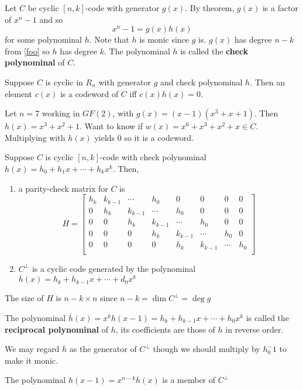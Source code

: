 \documentclass{article}
\begin{document}
\begin{definition}
  Let \( C \) be cyclic \( [n, k] \)-code with generator \( g(x) \).
  By theorem, \( g(x) \) is a factor of \( x^n-1 \) and so \[
    x^n-1= g(x)h(x)
  \] for some polynominal \( h \). Note that \( h  \) is monic since
  \( g  \) is. \( g(x) \) has degree \( n-k  \) from \autoref{foo} so
  \( h  \) has degree \( k \). The polynominal \( h  \) is called the
  \textbf{check polynominal} of \( C \).
\end{definition}
\begin{theorem}
  Suppose \( C \) is cyclic in \( R_n  \) with generator \( g  \) and
  check polynominal \( h \). Then an element \( c(x)  \) is a
  codeword of \( C \) iff \( c(x)h(x) = 0 \).
\end{theorem}
\begin{example}
  Let \( n = 7 \) working in \( GF(2) \), with \( g(x) =  (x-1)(x^3+x+1)\). Then \( h(x) = x^3+x^2+1 \). Want to know if \( w(x) = x^6+x^3+x^2+x \in C \). Multiplying with \( h(x) \) yields \( 0 \) so it is a codeword.
\end{example}
\begin{theorem}
  Suppose \( C  \) is cyclic \( [n, k] \)-code with check polynominal
  \( h(x) = h_0 + h_1x + \cdots + h_kx^k \). Then,
  \begin{enumerate}
    \item a parity-check matrix for \( C  \) is \[
            H =
            \begin{bmatrix}
              h_k & k_{k-1} & \cdots  & h_0     & 0       & 0       & 0      & 0   \\
              0   & h_k     & k_{k-1} & \cdots  & h_0     & 0       & 0      & 0   \\
              0   & 0       & h_k     & k_{k-1} & \cdots  & h_0     & 0      & 0   \\
              0   & 0       & 0       & h_k     & k_{k-1} & \cdots  & h_0    & 0   \\
              0   & 0       & 0       & 0       & h_k     & k_{k-1} & \cdots & h_0 \\
            \end{bmatrix}
          \]
    \item \( C^\perp \) is a cyclic code generated by the polynominal \(
          \overline{h}(x) = h_k + h_{k-1}x + \cdots + d_0x^k   \)
  \end{enumerate}

  The size of \( H \) is \( n - k \times n\) since \( n-k = \dim C^\perp = \deg g  \) 
\end{theorem}
\begin{definition}
  The polynominal \( \overline{h}(x) = x^kh(x-1) = h_k + h_{k-1}x + \cdots + h_0x^k    \) is called the \textbf{reciprocal polynominal} of \( h \), its coefficients are those of \( h   \) in reverse order.

  We may regard \( \overline{h}  \) as the generator of \( C^\perp  \) though we should multiply by \( h_0^-1 \) to make it monic.
\end{definition}
\begin{remark}
  The polynominal \( h(x-1) =x^{n-k}\overline{h}(x) \) is a member of \( C^\perp  \)
\end{remark}
\end{document}
